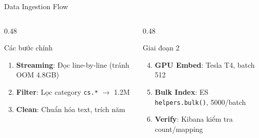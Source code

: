\begin{frame}{Data Ingestion Flow}
\begin{columns}[T]
\begin{column}{0.48\textwidth}
\begin{block}{Các bước chính}
{\small
\begin{enumerate}
    \item \textbf{Streaming}: Đọc line-by-line (tránh OOM 4.8GB)
    \item \textbf{Filter}: Lọc category \texttt{cs.*} $\to$ 1.2M
    \item \textbf{Clean}: Chuẩn hóa text, trích năm
\end{enumerate}
}
\end{block}
\end{column}
\begin{column}{0.48\textwidth}
\begin{block}{Giai đoạn 2}
{\small
\begin{enumerate}\setcounter{enumi}{3}
    \item \textbf{GPU Embed}: Tesla T4, batch 512
    \item \textbf{Bulk Index}: ES \texttt{helpers.bulk()}, 5000/batch
    \item \textbf{Verify}: Kibana kiểm tra count/mapping
\end{enumerate}
}
\end{block}
\end{column}
\end{columns}
\end{frame}

